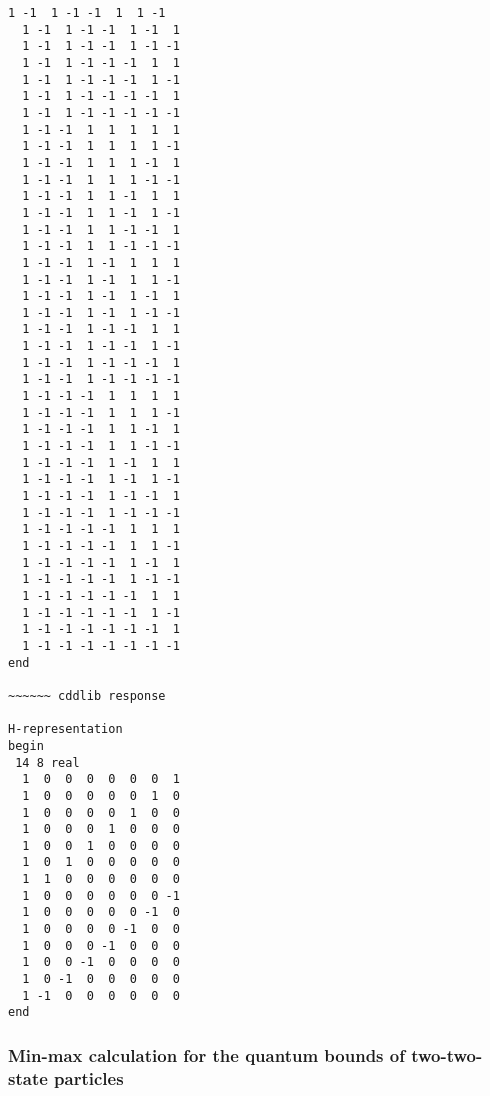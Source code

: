 \documentclass[%
  twocolumn,
 showpacs,
 showkeys,
 preprintnumbers,
 amsmath,amssymb,
 aps,
  pra,
  longbibliography,
 floatfix,
 ]{revtex4-1}
\begin{document}
{\begin{lstlisting}[backgroundcolor=\color{yellow!10},framerule=0pt,breaklines=true, frame=tb]
  1 -1  1 -1 -1  1  1 -1
  1 -1  1 -1 -1  1 -1  1
  1 -1  1 -1 -1  1 -1 -1
  1 -1  1 -1 -1 -1  1  1
  1 -1  1 -1 -1 -1  1 -1
  1 -1  1 -1 -1 -1 -1  1
  1 -1  1 -1 -1 -1 -1 -1
  1 -1 -1  1  1  1  1  1
  1 -1 -1  1  1  1  1 -1
  1 -1 -1  1  1  1 -1  1
  1 -1 -1  1  1  1 -1 -1
  1 -1 -1  1  1 -1  1  1
  1 -1 -1  1  1 -1  1 -1
  1 -1 -1  1  1 -1 -1  1
  1 -1 -1  1  1 -1 -1 -1
  1 -1 -1  1 -1  1  1  1
  1 -1 -1  1 -1  1  1 -1
  1 -1 -1  1 -1  1 -1  1
  1 -1 -1  1 -1  1 -1 -1
  1 -1 -1  1 -1 -1  1  1
  1 -1 -1  1 -1 -1  1 -1
  1 -1 -1  1 -1 -1 -1  1
  1 -1 -1  1 -1 -1 -1 -1
  1 -1 -1 -1  1  1  1  1
  1 -1 -1 -1  1  1  1 -1
  1 -1 -1 -1  1  1 -1  1
  1 -1 -1 -1  1  1 -1 -1
  1 -1 -1 -1  1 -1  1  1
  1 -1 -1 -1  1 -1  1 -1
  1 -1 -1 -1  1 -1 -1  1
  1 -1 -1 -1  1 -1 -1 -1
  1 -1 -1 -1 -1  1  1  1
  1 -1 -1 -1 -1  1  1 -1
  1 -1 -1 -1 -1  1 -1  1
  1 -1 -1 -1 -1  1 -1 -1
  1 -1 -1 -1 -1 -1  1  1
  1 -1 -1 -1 -1 -1  1 -1
  1 -1 -1 -1 -1 -1 -1  1
  1 -1 -1 -1 -1 -1 -1 -1
end

~~~~~~ cddlib response

H-representation
begin
 14 8 real
  1  0  0  0  0  0  0  1
  1  0  0  0  0  0  1  0
  1  0  0  0  0  1  0  0
  1  0  0  0  1  0  0  0
  1  0  0  1  0  0  0  0
  1  0  1  0  0  0  0  0
  1  1  0  0  0  0  0  0
  1  0  0  0  0  0  0 -1
  1  0  0  0  0  0 -1  0
  1  0  0  0  0 -1  0  0
  1  0  0  0 -1  0  0  0
  1  0  0 -1  0  0  0  0
  1  0 -1  0  0  0  0  0
  1 -1  0  0  0  0  0  0
end

\end{lstlisting}  }



\subsubsection{Min-max calculation for the quantum bounds of two-two-state particles}
\end{document}
